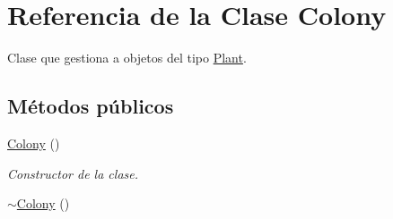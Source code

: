 \hypertarget{class_colony}{\section{Referencia de la Clase Colony}
\label{class_colony}
}


Clase que gestiona a objetos del tipo \hyperlink{class_plant}{Plant}.  


\subsection*{Métodos públicos}
\begin{DoxyCompactItemize}
\item 
\hypertarget{class_colony_aaf760edad97dee7263b86913d3bb4f98}{\hyperlink{class_colony_aaf760edad97dee7263b86913d3bb4f98}{Colony} ()}\label{class_colony_aaf760edad97dee7263b86913d3bb4f98}

\begin{DoxyCompactList}\small\item\em Constructor de la clase. \end{DoxyCompactList}\item 
\hypertarget{class_colony_a9cebe4a25260c8da7c99d10b0dab5a4e}{\hyperlink{class_colony_a9cebe4a25260c8da7c99d10b0dab5a4e}{$\sim$\+Colony} ()}\label{class_colony_a9cebe4a25260c8da7c99d10b0dab5a4e}


\end{DoxyCompactItemize}
